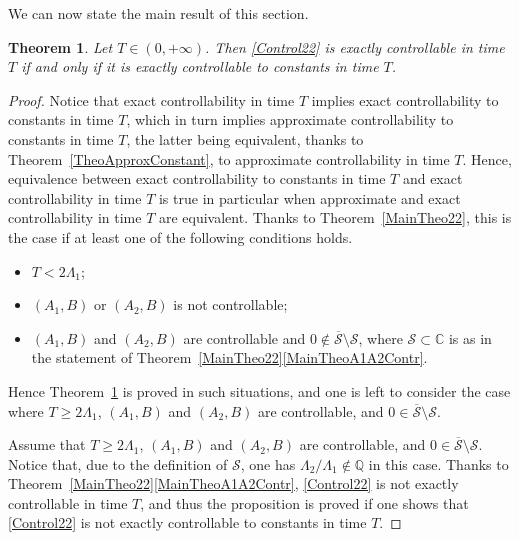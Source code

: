 \documentclass[10pt]{article}
\theoremstyle{plain}
\newtheorem{theo}{Theorem}[section]
\theoremstyle{definition}
\numberwithin{equation}{section}\numberwithin{figure}{section}\emergencystretch=3em
\begin{document}
We can now state the main result of this section.

\begin{theo}
\label{TheoExactConstant}
Let $T \in (0, +\infty)$. Then \eqref{Control22} is exactly controllable in time $T$ if and only if it is exactly controllable to constants in time $T$.
\end{theo}

\begin{proof}
Notice that exact controllability in time $T$ implies exact controllability to constants in time $T$, which in turn implies approximate controllability to constants in time $T$, the latter being equivalent, thanks to Theorem~\ref{TheoApproxConstant}, to approximate controllability in time $T$. Hence, equivalence between exact controllability to constants in time $T$ and exact controllability in time $T$ is true in particular when approximate and exact controllability in time $T$ are equivalent. Thanks to Theorem~\ref{MainTheo22}, this is the case if at least one of the following conditions holds.
\begin{itemize}
\item $T < 2 \Lambda_1$;
\item $(A_1, B)$ or $(A_2, B)$ is not controllable;
\item $(A_1, B)$ and $(A_2, B)$ are controllable and $0 \notin \overline{\mathcal S} \setminus \mathcal S$, where $\mathcal S \subset \mathbb C$ is as in the statement of Theorem~\ref{MainTheo22}\eqref{MainTheoA1A2Contr}.
\end{itemize}
Hence Theorem~\ref{TheoExactConstant} is proved in such situations, and one is left to consider the case where $T \geq 2 \Lambda_1$, $(A_1, B)$ and $(A_2, B)$ are controllable, and $0 \in \overline{\mathcal S} \setminus \mathcal S$.

Assume that $T \geq 2 \Lambda_1$, $(A_1, B)$ and $(A_2, B)$ are controllable, and $0 \in \overline{\mathcal S} \setminus \mathcal S$. Notice that, due to the definition of $\mathcal S$, one has $\Lambda_2 / \Lambda_1 \notin \mathbb Q$ in this case. Thanks to Theorem~\ref{MainTheo22}\eqref{MainTheoA1A2Contr}, \eqref{Control22} is not exactly controllable in time $T$, and thus the proposition is proved if one shows that \eqref{Control22} is not exactly controllable to constants in time $T$.


\end{proof}
\end{document}

